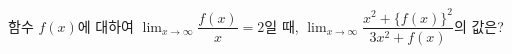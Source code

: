 함수 $f(x)$에 대하여 $\displaystyle\lim_{x\to\infty}\dfrac{f(x)}{x}=2$일 때, $\displaystyle\lim_{x\to\infty}\dfrac{x^2+\{f(x)\}^2}{3x^2+f(x)}$의 값은?
